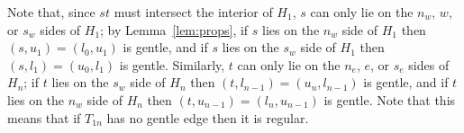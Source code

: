Note that, since $st$ must intersect the
interior of $H_1$, $s$ can only lie on the $n_w$, $w$, or $s_w$ sides of $H_1$;
by Lemma~\ref{lem:props}, if $s$ lies on the $n_w$ side of $H_1$ then
$(s,u_1) = (l_0,u_1)$ is gentle, and
if $s$ lies on the $s_w$ side of $H_1$ then $(s,l_1) = (u_0,l_1)$ is gentle. 
Similarly, $t$ can only lie on the $n_e$, $e$, or $s_e$ sides of $H_n$; if
$t$ lies on the $s_w$ side of $H_n$ then $(t,l_{n-1}) = (u_n,l_{n-1})$ is 
gentle, and if $t$ lies on the $n_w$ side of $H_n$ then 
$(t,u_{n-1}) = (l_n,u_{n-1})$ is gentle. Note that this means that if $T_{1n}$ has
no gentle edge then it is regular.





